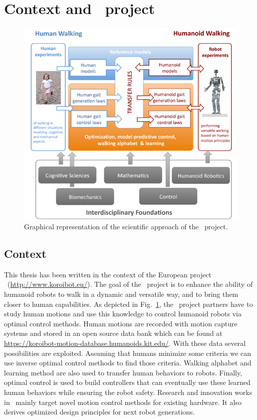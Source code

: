 \section*{Context and \koroibot\ project}

\begin{figure}[ht]
\centering
\includegraphics[width=0.8\linewidth]{figures/koroibot/components.png}
\caption{Graphical representation of the scientific approach of the \koroibot\ project.}
\label{fig:koroibot:components}
\end{figure}

\subsection*{Context}

This thesis has been written in the context of the European project \koroibot\ (\url{http://www.koroibot.eu/}).
The goal of the \koroibot\ project is to enhance the ability of humanoid robots to walk in a dynamic and versatile way, and to bring them closer to human capabilities.
As depicted in Fig.~\ref{fig:koroibot:components}, the \koroibot\ project partners have to study human motions and use this knowledge to control humanoid robots via optimal control methods.
Human motions are recorded with motion capture systems and stored in an open source data bank which can be found at \url{https://koroibot-motion-database.humanoids.kit.edu/}.
With these data several possibilities are exploited.
Assuming that humans minimize some criteria we can use inverse optimal control methods to find those criteria.
Walking alphabet and learning method \cite{Mandery2016b} are also used to transfer human behaviors to robots.
Finally, optimal control is used to build controllers that can eventually use these learned human behaviors while ensuring the robot safety.
Research and innovation works in \koroibot\ mainly target novel motion control methods for existing hardware.
It also derives optimized design principles for next robot generations.

